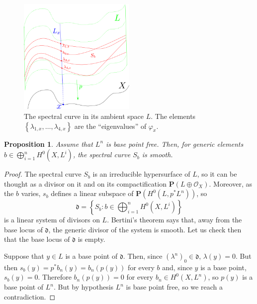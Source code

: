 \documentclass[12pt,a4paper]{book}
\newtheorem{prop}[thm]{Proposition}
\theoremstyle{definition} \newtheorem{defn}[thm]{Definition}
\theoremstyle{definition} \newtheorem{ejemplo}[thm]{Example}
\theoremstyle{remark} \newtheorem{rem}[thm]{Remark}
\def\OO{\mathscr{O}}
\def\PP{\mathbf{P}}
\begin{document}
       \begin{figure}[h]
	 \centering
	 \includegraphics[width=0.5\textwidth]{curvaespectral.png}
	 \caption{The spectral curve in its ambient space $L$. The elements $\left\{ \lambda_{1,x},\dots,\lambda_{4,x} \right\}$ are the ``eigenvalues'' of $\varphi_x$.}
	 \label{fig:spectral}
       \end{figure}

       \begin{prop}
	 Assume that $L^n$ is base point free. Then, for generic elements $b\in \bigoplus_{i=1}^n H^0(X,L^i)$, the spectral curve $S_b$ is smooth.
       \end{prop}

       \begin{proof}
	 The spectral curve $S_b$ is an irreducible hypersurface of $L$, so it can be thought as a divisor on it and on its compactification $\PP(L\oplus \OO_X)$. Moreover, as the $b$ varies, $s_b$ defines a linear subspace of $\PP(H^0(L,p^*L^n))$, so 
	 \begin{equation*}
	   \mathfrak{d}=\left\{ S_b: b\in \bigoplus_{i=1}^n H^0(X,L^i) \right\}
	 \end{equation*}
	 is a linear system of divisors on $L$. Bertini's theorem says that, away from the base locus of $\mathfrak{d}$, the generic divisor of the system is smooth. Let us check then that the base locus of $\mathfrak{d}$ is empty.

	 Suppose that $y \in L$ is a base point of $\mathfrak{d}$. Then, since $(\lambda^n)_0 \in \mathfrak{d}$, $\lambda(y)=0$. But then $s_b(y)=p^*b_n(y)=b_n(p(y))$ for every $b$ and, since $y$ is a base point, $s_b(y)=0$. Therefore $b_n(p(y)) = 0$ for every $b_n \in H^0(X,L^n)$, so $p(y)$ is a base point of $L^n$. But by hypothesis $L^n$ is base point free, so we reach a contradiction.
       \end{proof}
\end{document}
